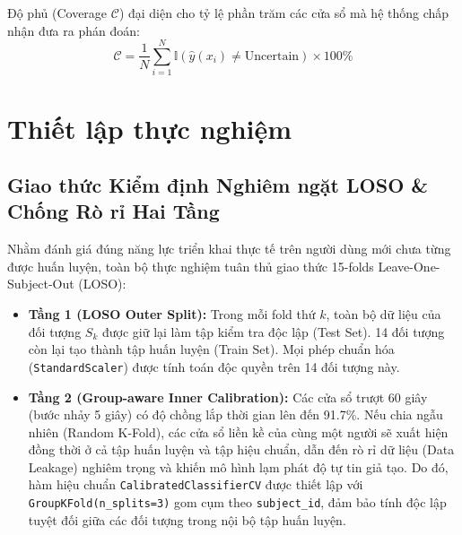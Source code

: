 \documentclass[conference]{IEEEtran}
\begin{document}
Độ phủ (Coverage $\mathcal{C}$) đại diện cho tỷ lệ phần trăm các cửa sổ mà hệ thống chấp nhận đưa ra phán đoán:
\begin{equation}
\mathcal{C} = \frac{1}{N} \sum_{i=1}^N \mathbb{I}(\hat{y}(x_i) \neq \text{Uncertain}) \times 100\%
\end{equation}

\section{Thiết lập thực nghiệm}

\subsection{Giao thức Kiểm định Nghiêm ngặt LOSO \& Chống Rò rỉ Hai Tầng}
Nhằm đánh giá đúng năng lực triển khai thực tế trên người dùng mới chưa từng được huấn luyện, toàn bộ thực nghiệm tuân thủ giao thức 15-folds Leave-One-Subject-Out (LOSO):
\begin{itemize}
    \item \textbf{Tầng 1 (LOSO Outer Split):} Trong mỗi fold thứ $k$, toàn bộ dữ liệu của đối tượng $S_k$ được giữ lại làm tập kiểm tra độc lập (Test Set). 14 đối tượng còn lại tạo thành tập huấn luyện (Train Set). Mọi phép chuẩn hóa (\texttt{StandardScaler}) được tính toán độc quyền trên 14 đối tượng này.
    \item \textbf{Tầng 2 (Group-aware Inner Calibration):} Các cửa sổ trượt 60 giây (bước nhảy 5 giây) có độ chồng lắp thời gian lên đến 91.7\%. Nếu chia ngẫu nhiên (Random K-Fold), các cửa sổ liền kề của cùng một người sẽ xuất hiện đồng thời ở cả tập huấn luyện và tập hiệu chuẩn, dẫn đến rò rỉ dữ liệu (Data Leakage) nghiêm trọng và khiến mô hình lạm phát độ tự tin giả tạo. Do đó, hàm hiệu chuẩn \texttt{CalibratedClassifierCV} được thiết lập với \texttt{GroupKFold(n\_splits=3)} gom cụm theo \texttt{subject\_id}, đảm bảo tính độc lập tuyệt đối giữa các đối tượng trong nội bộ tập huấn luyện.
\end{itemize}
\end{document}
